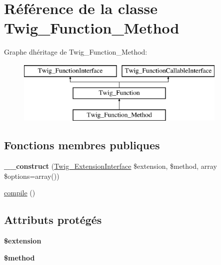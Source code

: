 \hypertarget{class_twig___function___method}{}\section{Référence de la classe Twig\+\_\+\+Function\+\_\+\+Method}
\label{class_twig___function___method}
Graphe d\textquotesingle{}héritage de Twig\+\_\+\+Function\+\_\+\+Method\+:\begin{figure}[H]
\begin{center}
\leavevmode
\includegraphics[height=3.000000cm]{class_twig___function___method}
\end{center}
\end{figure}
\subsection*{Fonctions membres publiques}
\begin{DoxyCompactItemize}
\item 
{\bfseries \+\_\+\+\_\+construct} (\hyperlink{interface_twig___extension_interface}{Twig\+\_\+\+Extension\+Interface} \$extension, \$method, array \$options=array())\hypertarget{class_twig___function___method_a7d07ee619832b0ff21eaf3c7c0159c3f}{}\label{class_twig___function___method_a7d07ee619832b0ff21eaf3c7c0159c3f}

\item 
\hyperlink{class_twig___function___method_a3815e7c2e73f00c2ebffcf5b90eef3b1}{compile} ()
\end{DoxyCompactItemize}
\subsection*{Attributs protégés}
\begin{DoxyCompactItemize}
\item 
{\bfseries \$extension}\hypertarget{class_twig___function___method_aed02cd2cd0ee08bd99a2ac1ef4f955ce}{}\label{class_twig___function___method_aed02cd2cd0ee08bd99a2ac1ef4f955ce}

\item 
{\bfseries \$method}\hypertarget{class_twig___function___method_a12661b2fc0f57f97e30a1620889ce9c6}{}\label{class_twig___function___method_a12661b2fc0f57f97e30a1620889ce9c6}

\end{DoxyCompactItemize}


